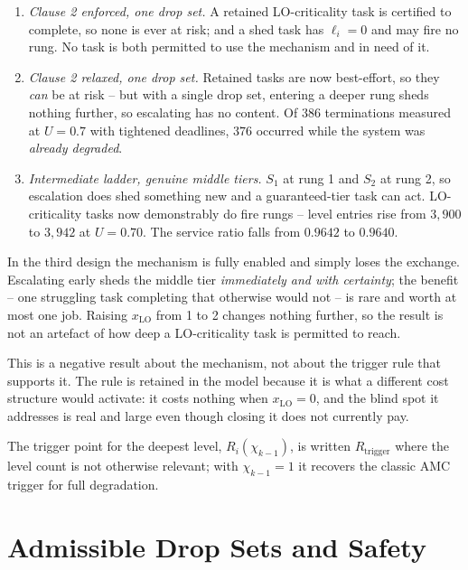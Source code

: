 \documentclass{article}
\begin{document}
\begin{enumerate}
\item \emph{Clause 2 enforced, one drop set.} A retained LO-criticality task is
  certified to complete, so none is ever at risk; and a shed task has
  $\ell_i = 0$ and may fire no rung. No task is both permitted to use the
  mechanism and in need of it.
\item \emph{Clause 2 relaxed, one drop set.} Retained tasks are now
  best-effort, so they \emph{can} be at risk -- but with a single drop set,
  entering a deeper rung sheds nothing further, so escalating has no content.
  Of $386$ terminations measured at $U = 0.7$ with tightened deadlines, $376$
  occurred while the system was \emph{already degraded}.
\item \emph{Intermediate ladder, genuine middle tiers.} $S_1$ at rung 1 and
  $S_2$ at rung 2, so escalation does shed something new and a guaranteed-tier
  task can act. LO-criticality tasks now demonstrably do fire rungs -- level
  entries rise from $3{,}900$ to $3{,}942$ at $U = 0.70$. The service ratio
  falls from $0.9642$ to $0.9640$.
\end{enumerate}

\noindent In the third design the mechanism is fully enabled and simply loses
the exchange. Escalating early sheds the middle tier \emph{immediately and with
certainty}; the benefit -- one struggling task completing that otherwise would
not -- is rare and worth at most one job. Raising $x_{\mathrm{LO}}$ from 1 to 2
changes nothing further, so the result is not an artefact of how deep a
LO-criticality task is permitted to reach.

This is a negative result about the mechanism, not about the trigger rule that
supports it. The rule is retained in the model because it is what a different
cost structure would activate: it costs nothing when $x_{\mathrm{LO}} = 0$, and
the blind spot it addresses is real and large even though closing it does not
currently pay.

The trigger point for the deepest level, $R_i(\chi_{k-1})$, is written
$R_{\mathrm{trigger}}$ where the level count is not otherwise relevant; with
$\chi_{k-1} = 1$ it recovers the classic AMC trigger for full degradation.

\section{Admissible Drop Sets and Safety}
\label{sec:admissibility}
\end{document}
